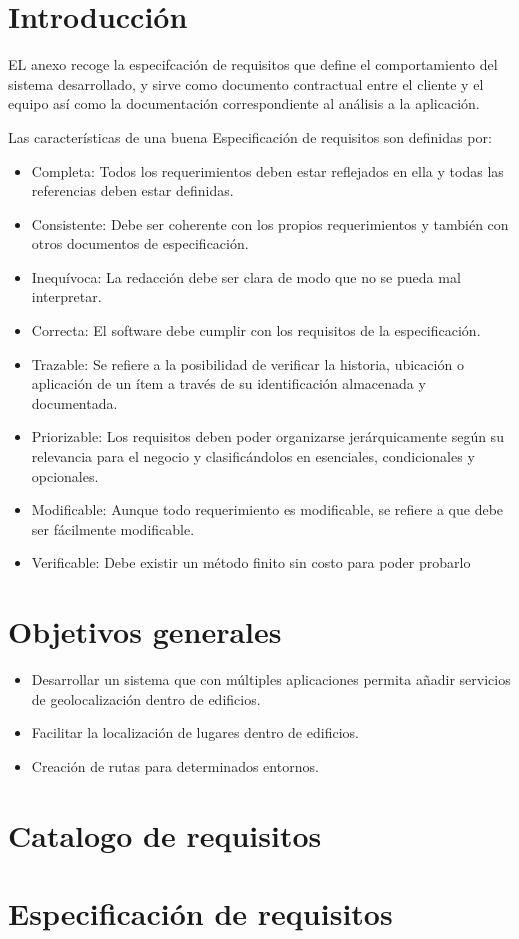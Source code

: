 
\section{Introducción}
EL anexo recoge la especifcación de requisitos que define el comportamiento del sistema desarrollado, y sirve como documento contractual entre el cliente y el equipo así como la documentación correspondiente al análisis a la aplicación.

Las características de una buena Especificación de requisitos son definidas por:
\begin{itemize}
\item
Completa: Todos los requerimientos deben estar reflejados en ella y todas las referencias deben estar definidas.
\item
Consistente: Debe ser coherente con los propios requerimientos y también con otros documentos de especificación.
\item
Inequívoca: La redacción debe ser clara de modo que no se pueda mal interpretar.
\item
Correcta: El software debe cumplir con los requisitos de la especificación.
\item
Trazable: Se refiere a la posibilidad de verificar la historia, ubicación o aplicación de un ítem a través de su identificación almacenada y documentada.
\item
Priorizable: Los requisitos deben poder organizarse jerárquicamente según su relevancia para el negocio y clasificándolos en esenciales, condicionales y opcionales.
\item
Modificable: Aunque todo requerimiento es modificable, se refiere a que debe ser fácilmente modificable.
\item
Verificable: Debe existir un método finito sin costo para poder probarlo
\end{itemize}


\section{Objetivos generales}
\begin{itemize}
\item
Desarrollar un sistema que con múltiples aplicaciones permita añadir
servicios de geolocalización dentro de edificios.
\item
Facilitar la localización de lugares dentro de edificios.
\item
Creación de rutas para determinados entornos.
\end{itemize}
\section{Catalogo de requisitos}

\section{Especificación de requisitos}


